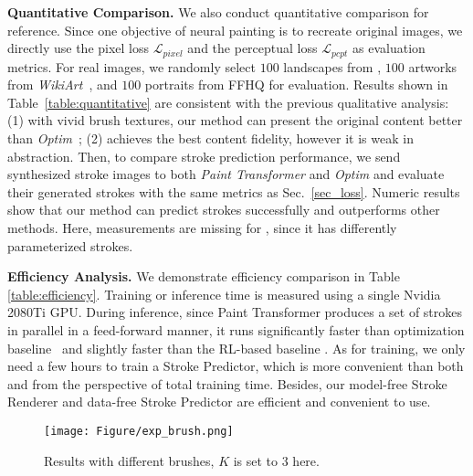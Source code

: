 \documentclass[10pt,twocolumn,letterpaper]{article}
\begin{document}
\noindent
\textbf{Quantitative Comparison.}
We also conduct quantitative comparison for reference. 
Since one objective of neural painting is to recreate original images, we directly use the pixel loss $\mathcal{L}_{pixel}$ and the perceptual loss $\mathcal{L}_{pcpt}$ \cite{johnson2016perceptual} as evaluation metrics.
For real images, we randomly select $100$ landscapes from \cite{arnaud58}, $100$ artworks from \textit{WikiArt}~\cite{phillips2011wiki}, and $100$ portraits from FFHQ \cite{karras2019stylebased} for evaluation. 
Results shown in Table~\ref{table:quantitative} are consistent with the previous qualitative analysis: (1) with vivid brush textures, our method can present the original content better than \emph{Optim}~\cite{zou2020stylized}; (2) \cite{huang2019learning} achieves the best content fidelity, however it is weak in abstraction.
Then, to compare stroke prediction performance, we send synthesized stroke images to both \emph{Paint Transformer} and \emph{Optim} and evaluate their generated strokes with the same metrics as Sec.~\ref{sec_loss}.
Numeric results show that our method can predict strokes successfully and outperforms other methods. 
Here, measurements are missing for \cite{huang2019learning}, since it has differently parameterized strokes.


\noindent
\textbf{Efficiency Analysis.}
We demonstrate efficiency comparison in Table \ref{table:efficiency}.
Training or inference time is measured using a single Nvidia 2080Ti GPU.
During inference, since Paint Transformer produces a set of strokes in parallel in a feed-forward manner, it runs significantly faster than optimization baseline~\cite{zou2020stylized} and slightly faster than the RL-based baseline \cite{huang2019learning}.
As for training, we only need a few hours to train a Stroke Predictor, which is more convenient than both \cite{huang2019learning} and \cite{zou2020stylized} from the perspective of total training time.
Besides, our model-free Stroke Renderer and data-free Stroke Predictor are efficient and convenient to use.

\begin{figure}[t]
\begin{center}
\texttt{[image: Figure/exp\_brush.png]}
\end{center}
\vspace{-0.5cm}
   \caption{Results with different brushes, $K$ is set to 3 here.}
\label{fig:change_stroke}
\vspace{-0.5cm}
\end{figure}
\end{document}

